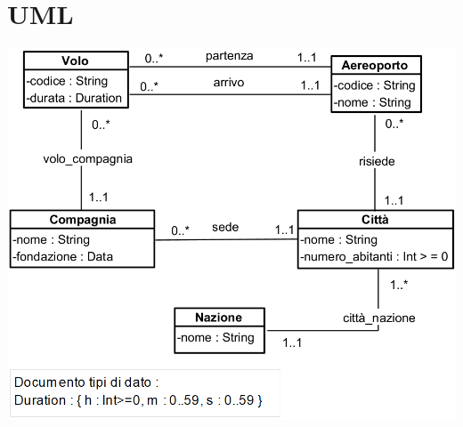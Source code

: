 \documentclass[12pt, letterpaper]{article}
\begin{document}
\section{UML}
\includegraphics[width=\textwidth]{images/UML.png}
\end{document}
